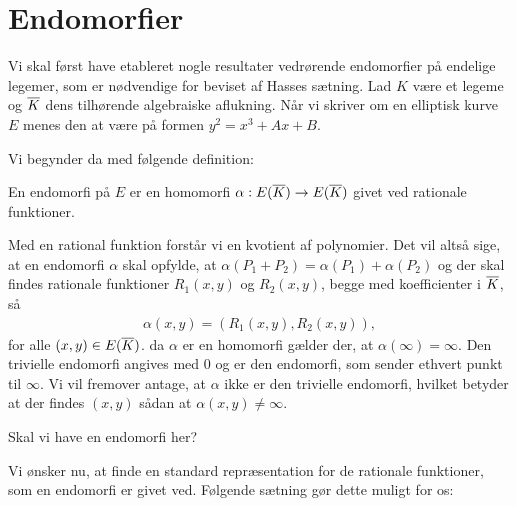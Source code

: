 \section{Endomorfier}
Vi skal først have etableret nogle resultater vedrørende endomorfier på endelige legemer, som
er nødvendige for beviset af Hasses sætning. Lad $K$ være et legeme og $\overline{K}$ dens tilhørende algebraiske aflukning. Når vi skriver om en elliptisk kurve $E$ menes den at være på formen $y^2 = x^3 + Ax + B$. 

Vi begynder da med følgende definition:

\begin{definition}
En endomorfi på $E$ er en homomorfi $\alpha : E(\overline{K}) \to E(\overline{K})$ givet
ved rationale funktioner.
\end{definition}

Med en rational funktion forstår vi en kvotient af polynomier. Det vil altså sige, at 
en endomorfi $\alpha$ skal opfylde, at $\alpha(P_1 + P_2) = \alpha(P_1) + \alpha(P_2)$ 
og der skal findes rationale 
funktioner $R_1(x, y)$ og $R_2(x, y)$, begge med koefficienter i $\overline{K}$, så
\begin{align*}
	\alpha(x, y) = (R_1(x, y), R_2(x, y)),
\end{align*}
for alle $(x, y) \in E(\overline{K})$. da $\alpha$ er en homomorfi gælder der, at $\alpha(\infty)=\infty$. Den trivielle endomorfi angives med $0$ og er den endomorfi, som sender ethvert punkt til $\infty$. Vi vil fremover antage, at $\alpha$ ikke er den trivielle endomorfi, hvilket betyder at der findes $(x, y)$ sådan at $\alpha(x, y) \neq \infty$.

\begin{example}
Skal vi have en endomorfi her?
\end{example}

Vi ønsker nu, at finde en standard repræsentation for de rationale funktioner, som en endomorfi er givet ved. Følgende sætning gør dette muligt for os:

